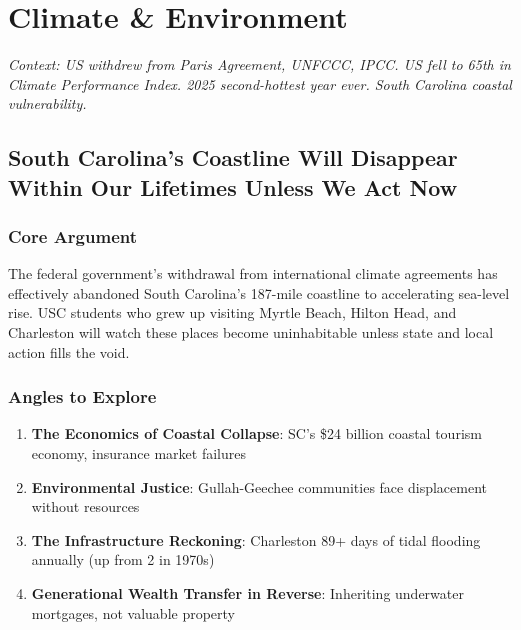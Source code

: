 \documentclass[11pt,letterpaper]{article}
\begin{document}
\newpage
\section{Climate \& Environment}

\textit{Context: US withdrew from Paris Agreement, UNFCCC, IPCC. US fell to 65th in Climate Performance Index. 2025 second-hottest year ever. South Carolina coastal vulnerability.}

\newpage
\subsection{South Carolina's Coastline Will Disappear Within Our Lifetimes Unless We Act Now}

\subsubsection*{Core Argument}
The federal government's withdrawal from international climate agreements has effectively abandoned South Carolina's 187-mile coastline to accelerating sea-level rise. USC students who grew up visiting Myrtle Beach, Hilton Head, and Charleston will watch these places become uninhabitable unless state and local action fills the void.

\subsubsection*{Angles to Explore}
\begin{enumerate}[noitemsep]
    \item \textbf{The Economics of Coastal Collapse}: SC's \$24 billion coastal tourism economy, insurance market failures
    \item \textbf{Environmental Justice}: Gullah-Geechee communities face displacement without resources
    \item \textbf{The Infrastructure Reckoning}: Charleston 89+ days of tidal flooding annually (up from 2 in 1970s)
    \item \textbf{Generational Wealth Transfer in Reverse}: Inheriting underwater mortgages, not valuable property
\end{enumerate}
\end{document}
